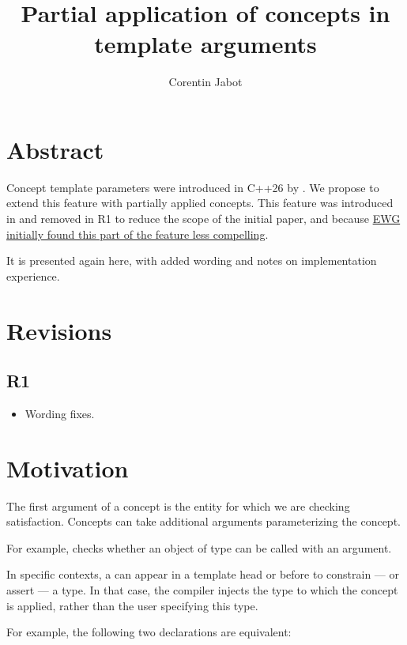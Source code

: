 \documentclass{wg21}
\title{Partial application of concepts in template arguments}
\author{Corentin Jabot}{corentin.jabot@gmail.com}
\begin{document}
\maketitle

\section{Abstract}

Concept template parameters were introduced in C++26 by . We propose to extend this feature with partially applied concepts.
This feature was introduced in  and removed in R1 to reduce the scope of the initial paper,
and because \href{https://github.com/cplusplus/papers/issues/1546#issuecomment-1587401642}{EWG initially found this part of the feature less compelling}.

It is presented again here, with added wording and notes on implementation experience.


\section{Revisions}

\subsection{R1}

\begin{itemize}
\item Wording fixes.
\end{itemize}

\section{Motivation}


The first argument of a concept is the entity for which we are checking satisfaction.
Concepts can take additional arguments parameterizing the concept.

For example,  checks whether an object of type  can be called
with an  argument.

In specific contexts, a  can appear in a template head or before  to constrain --- or assert ---
a type. In that case, the compiler injects the type to which the concept is applied, rather than the user specifying this type.

For example, the following two declarations are equivalent:
\end{document}
